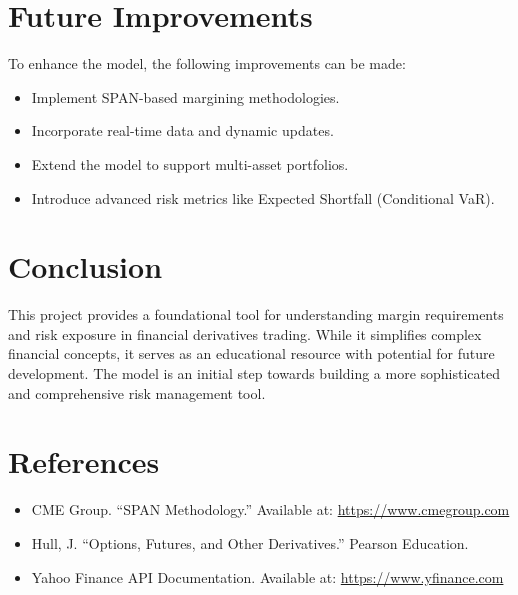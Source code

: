 \documentclass[a4paper,12pt]{article}
\begin{document}
\section{Future Improvements}
To enhance the model, the following improvements can be made:
\begin{itemize}
    \item Implement SPAN-based margining methodologies.
    \item Incorporate real-time data and dynamic updates.
    \item Extend the model to support multi-asset portfolios.
    \item Introduce advanced risk metrics like Expected Shortfall (Conditional VaR).
\end{itemize}

\section{Conclusion}
This project provides a foundational tool for understanding margin requirements and risk exposure in financial derivatives trading. While it simplifies complex financial concepts, it serves as an educational resource with potential for future development. The model is an initial step towards building a more sophisticated and comprehensive risk management tool.

\section{References}
\begin{itemize}
    \item CME Group. ``SPAN Methodology.'' Available at: \url{https://www.cmegroup.com}
    \item Hull, J. ``Options, Futures, and Other Derivatives.'' Pearson Education.
    \item Yahoo Finance API Documentation. Available at: \url{https://www.yfinance.com}
\end{itemize}
\end{document}

